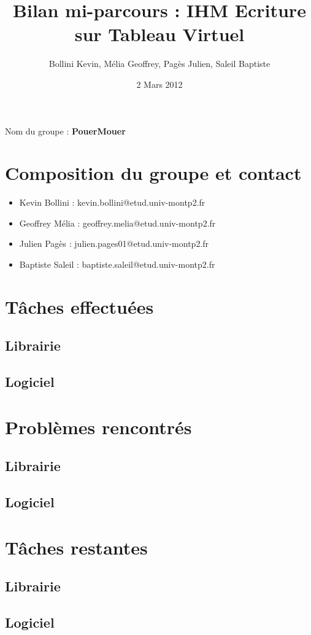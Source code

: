 \documentclass{article}
\title{Bilan mi-parcours : IHM Ecriture sur Tableau Virtuel}
\author{Bollini Kevin, Mélia Geoffrey, Pagès Julien, Saleil Baptiste}
\date{2 Mars 2012}
\begin{document}
\maketitle
	Nom du groupe : \textbf{PouerMouer}
	\section{Composition du groupe et contact}
	
	\begin{itemize}
	\item Kevin Bollini : kevin.bollini@etud.univ-montp2.fr \\
	\item Geoffrey Mélia : geoffrey.melia@etud.univ-montp2.fr \\
	\item Julien Pagès : julien.pages01@etud.univ-montp2.fr \\
	\item Baptiste Saleil : baptiste.saleil@etud.univ-montp2.fr \\
	\end{itemize} 	

	\section{Tâches effectuées}
		\subsection{Librairie}
		\subsection{Logiciel}
	\section{Problèmes rencontrés}
		\subsection{Librairie}
		\subsection{Logiciel}
	\section{Tâches restantes}
		\subsection{Librairie}
		\subsection{Logiciel}
\end{document}

